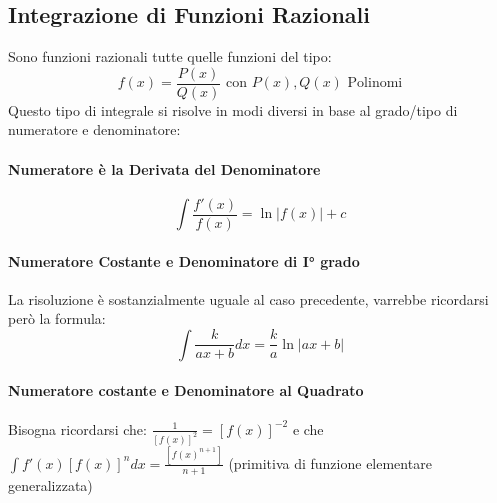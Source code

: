\documentclass[12pt, a4paper, openany]{book}
\begin{document}

	\subsection{Integrazione di Funzioni Razionali}
	Sono funzioni razionali tutte quelle funzioni del tipo:
	$$f(x)=\frac{P(x)}{Q(x)} \text{ con } P(x),Q(x) \text{ Polinomi} $$
	Questo tipo di integrale si risolve in modi diversi in base al grado/tipo di numeratore e denominatore:
	\paragraph*{Numeratore è la Derivata del Denominatore}
	$$\int \frac{f'(x)}{f(x)} = \ln|f(x)|+ c$$

	\paragraph*{Numeratore Costante e Denominatore di I° grado}
	La risoluzione è sostanzialmente uguale al caso precedente, varrebbe ricordarsi però la formula:
	$$\int\frac{k}{ax+b} dx = \frac{k}{a} \ln|ax+b|$$
	
	\paragraph*{Numeratore costante e Denominatore al Quadrato}
	Bisogna ricordarsi che:
	$\frac{1}{[f(x)]^2} = [f(x)]^{-2}$ e che 
	$\int f'(x)[f(x)]^n dx = \frac{[f(x)^{n+1}]}{n+1}$ (primitiva di funzione elementare generalizzata)
	
\end{document}
